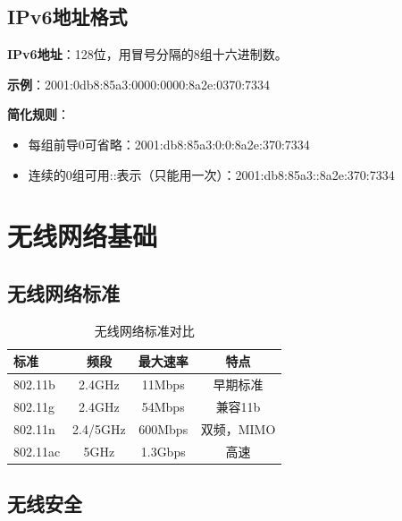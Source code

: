 \documentclass[12pt,a4paper]{ctexart}
\begin{document}
\subsection{IPv6地址格式}

\begin{keybox}
\textbf{IPv6地址}：128位，用冒号分隔的8组十六进制数。

\textbf{示例}：2001:0db8:85a3:0000:0000:8a2e:0370:7334

\textbf{简化规则}：
\begin{itemize}[itemsep=0pt]
    \item 每组前导0可省略：2001:db8:85a3:0:0:8a2e:370:7334
    \item 连续的0组可用::表示（只能用一次）：2001:db8:85a3::8a2e:370:7334
\end{itemize}
\end{keybox}

\section{无线网络基础}

\subsection{无线网络标准}

\begin{table}[htbp]
\centering
\begin{tabular}{lccc}
\toprule
\textbf{标准} & \textbf{频段} & \textbf{最大速率} & \textbf{特点} \\
\midrule
802.11b & 2.4GHz & 11Mbps & 早期标准 \\
802.11g & 2.4GHz & 54Mbps & 兼容11b \\
802.11n & 2.4/5GHz & 600Mbps & 双频，MIMO \\
802.11ac & 5GHz & 1.3Gbps & 高速 \\
\bottomrule
\end{tabular}
\caption{无线网络标准对比}
\end{table}

\subsection{无线安全}
\end{document}

